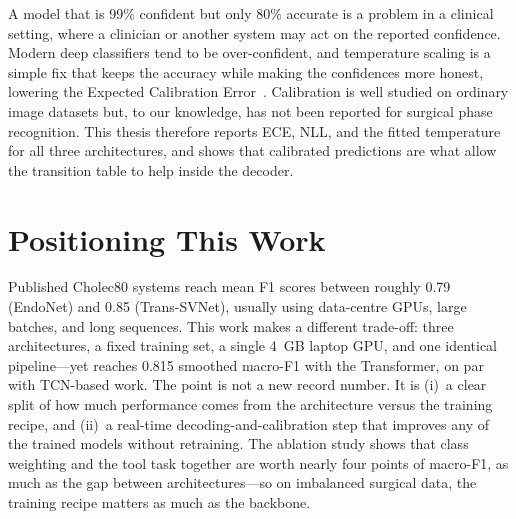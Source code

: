 \documentclass[11pt,a4paper]{report}
\begin{document}
A model that is 99\% confident but only 80\% accurate is a problem in a clinical setting, where a clinician or another system may act on the reported confidence. Modern deep classifiers tend to be over-confident, and temperature scaling is a simple fix that keeps the accuracy while making the confidences more honest, lowering the Expected Calibration Error~\cite{guo2017calibration}. Calibration is well studied on ordinary image datasets but, to our knowledge, has not been reported for surgical phase recognition. This thesis therefore reports ECE, NLL, and the fitted temperature for all three architectures, and shows that calibrated predictions are what allow the transition table to help inside the decoder.

\section{Positioning This Work}

Published Cholec80 systems reach mean F1 scores between roughly 0.79 (EndoNet) and 0.85 (Trans-SVNet), usually using data-centre GPUs, large batches, and long sequences. This work makes a different trade-off: three architectures, a fixed training set, a single 4~GB laptop GPU, and one identical pipeline---yet reaches 0.815 smoothed macro-F1 with the Transformer, on par with TCN-based work. The point is not a new record number. It is (i)~a clear split of how much performance comes from the architecture versus the training recipe, and (ii)~a real-time decoding-and-calibration step that improves any of the trained models without retraining. The ablation study shows that class weighting and the tool task together are worth nearly four points of macro-F1, as much as the gap between architectures---so on imbalanced surgical data, the training recipe matters as much as the backbone.






\printbibliography[title={References}]
\end{document}
